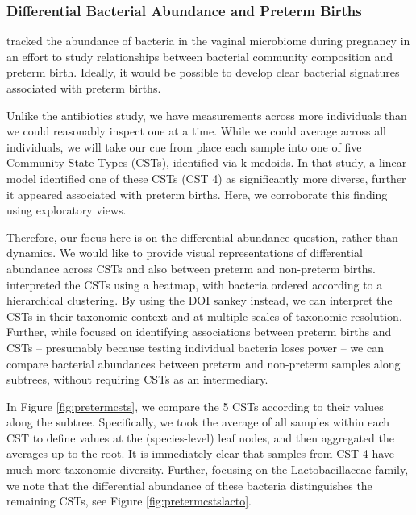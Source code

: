 \documentclass[12pt]{article}
\begin{document}
\subsubsection*{Differential Bacterial Abundance and Preterm
Births}\label{differential-bacterial-abundance-and-preterm-births}

\citet{digiulio2015temporal}
tracked the abundance of bacteria in the vaginal microbiome during
pregnancy in an effort to study relationships between bacterial
community composition and preterm birth. Ideally, it would be possible
to develop clear bacterial signatures associated with preterm births.

Unlike the antibiotics study, we have measurements across more
individuals than we could reasonably inspect one at a time. While we
could average across all individuals, we will take our cue from
\citep{digiulio2015temporal}
place each sample into one of five Community State Types (CSTs),
identified via k-medoids. In that study, a linear model identified one
of these CSTs (CST 4) as significantly more diverse, further it appeared
associated with preterm births. Here, we corroborate this finding using
exploratory views.

Therefore, our focus here is on the differential abundance question,
rather than dynamics. We would like to provide visual representations of
differential abundance across CSTs and also between preterm and non-preterm
births. \citet{digiulio2015temporal} interpreted the CSTs using a heatmap, with
bacteria ordered according to a hierarchical clustering. By using the DOI sankey
instead, we can interpret the CSTs in their taxonomic context and at multiple
scales of taxonomic resolution. Further, while
\citet{digiulio2015temporal} focused on identifying associations between
preterm births and CSTs -- presumably because testing individual bacteria loses
power -- we can compare bacterial abundances between preterm and non-preterm
samples along subtrees, without requiring CSTs as an intermediary.

In Figure \ref{fig:pretermcsts}, we compare the 5 CSTs according to
their values along the subtree. Specifically, we took the average of all
samples within each CST to define values at the (species-level) leaf
nodes, and then aggregated the averages up to the root. It is
immediately clear that samples from CST 4 have much more taxonomic
diversity. Further, focusing on the Lactobacillaceae family, we note
that the differential abundance of these bacteria distinguishes the
remaining CSTs, see Figure \ref{fig:pretermcstslacto}.
\end{document}
